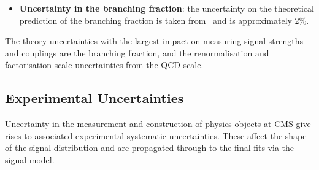 \begin{itemize}[noitemsep]
{\begin{itemize}[noitemsep]
        \end{itemize}}
    \item{\textbf{Uncertainty in the \Hgg branching fraction}: the uncertainty on the theoretical prediction of the \Hgg branching fraction is taken from~\cite{LHCHXS} and is approximately 2\%.}
\end{itemize}

The theory uncertainties with the largest impact on measuring signal strengths and couplings are the \Hgg branching fraction, and the renormalisation and factorisation scale uncertainties from the QCD scale. 



\subsection{Experimental Uncertainties}
Uncertainty in the measurement and construction of physics objects at CMS give rises to associated experimental systematic uncertainties. 
These affect the shape of the signal distribution and are propagated through to the final fits via the signal model. 
